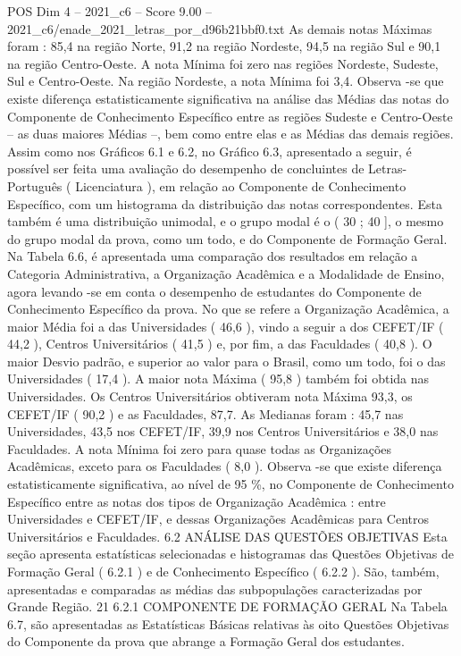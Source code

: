 \begin{textsample}{POS Dim 4 – 2021\_c6 – Score 9.00 – 2021\_c6/enade\_2021\_letras\_por\_d96b21bbf0.txt}
As demais notas Máximas foram : 85,4 na região Norte, 91,2 na região Nordeste, 94,5 na região Sul e 90,1 na região Centro-Oeste.
A nota Mínima foi zero nas regiões Nordeste, Sudeste, Sul e Centro-Oeste.
Na região Nordeste, a nota Mínima foi 3,4.
Observa -se que existe diferença estatisticamente significativa na análise das Médias das notas do Componente de Conhecimento Específico entre as regiões Sudeste e Centro-Oeste – as duas maiores Médias –, bem como entre elas e as Médias das demais regiões.
Assim como nos Gráficos 6.1 e 6.2, no Gráfico 6.3, apresentado a seguir, é possível ser feita uma avaliação do desempenho de concluintes de Letras-Português ( Licenciatura ), em relação ao Componente de Conhecimento Específico, com um histograma da distribuição das notas correspondentes.
Esta também é uma distribuição unimodal, e o grupo modal é o ( 30 ; 40 ], o mesmo do grupo modal da prova, como um todo, e do Componente de Formação Geral.
Na Tabela 6.6, é apresentada uma comparação dos resultados em relação a Categoria Administrativa, a Organização Acadêmica e a Modalidade de Ensino, agora levando -se em conta o desempenho de estudantes do Componente de Conhecimento Específico da prova.
No que se refere a Organização Acadêmica, a maior Média foi a das Universidades ( 46,6 ), vindo a seguir a dos CEFET/IF ( 44,2 ), Centros Universitários ( 41,5 ) e, por fim, a das Faculdades ( 40,8 ).
O maior Desvio padrão, e superior ao valor para o Brasil, como um todo, foi o das Universidades ( 17,4 ).
A maior nota Máxima ( 95,8 ) também foi obtida nas Universidades.
Os Centros Universitários obtiveram nota Máxima 93,3, os CEFET/IF ( 90,2 ) e as Faculdades, 87,7.
As Medianas foram : 45,7 nas Universidades, 43,5 nos CEFET/IF, 39,9 nos Centros Universitários e 38,0 nas Faculdades.
A nota Mínima foi zero para quase todas as Organizações Acadêmicas, exceto para os Faculdades ( 8,0 ).
Observa -se que existe diferença estatisticamente significativa, ao nível de 95 \%, no Componente de Conhecimento Específico entre as notas dos tipos de Organização Acadêmica : entre Universidades e CEFET/IF, e dessas Organizações Acadêmicas para Centros Universitários e Faculdades. 6.2 ANÁLISE DAS QUESTÕES OBJETIVAS Esta seção apresenta estatísticas selecionadas e histogramas das Questões Objetivas de Formação Geral ( 6.2.1 ) e de Conhecimento Específico ( 6.2.2 ).
São, também, apresentadas e comparadas as médias das subpopulações caracterizadas por Grande Região. 21 6.2.1 COMPONENTE DE FORMAÇÃO GERAL Na Tabela 6.7, são apresentadas as Estatísticas Básicas relativas às oito Questões Objetivas do Componente da prova que abrange a Formação Geral dos estudantes.

\end{textsample}
